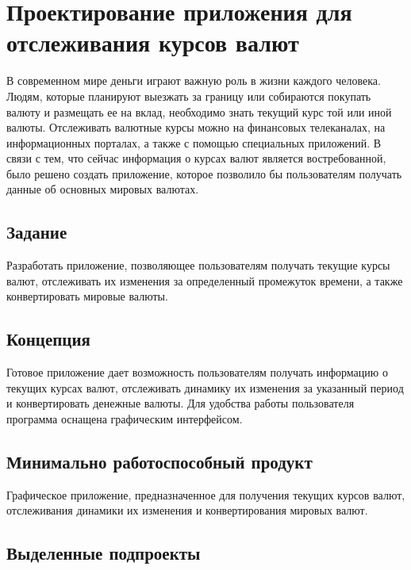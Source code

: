 \documentclass[a4paper]{article}
\begin{document}
\vfill %








\tableofcontents
\newpage



\section{Проектирование приложения для отслеживания курсов валют}

В современном мире деньги играют важную роль в жизни каждого человека. Людям, которые планируют выезжать за границу или собираются покупать валюту и размещать ее на вклад, необходимо знать текущий курс той или иной валюты. Отслеживать валютные курсы можно на финансовых телеканалах, на информационных порталах, а также с помощью специальных приложений. В связи с тем, что сейчас информация о курсах валют является востребованной, было решено создать приложение, которое позволило бы пользователям получать данные об основных мировых валютах.   

\subsection{Задание}

Разработать приложение, позволяющее пользователям получать текущие курсы валют, отслеживать их изменения за определенный промежуток времени, а также конвертировать мировые валюты.

\subsection{Концепция}

Готовое приложение дает возможность пользователям получать информацию о текущих курсах валют, отслеживать динамику их изменения за указанный период и конвертировать денежные валюты. Для удобства работы пользователя программа оснащена графическим интерфейсом.

\subsection{Минимально работоспособный продукт}

Графическое приложение, предназначенное для получения текущих курсов валют, отслеживания динамики их изменения и конвертирования мировых валют.

\subsection{Выделенные подпроекты}
\end{document}
